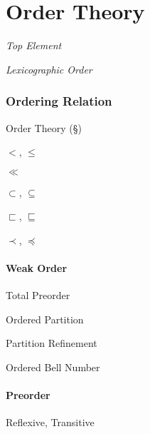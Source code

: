 \part{Order Theory}\label{sec:order_theory}

\emph{Top Element}

\emph{Lexicographic Order}



\section{Ordering Relation}\label{sec:ordering_relation}

Order Theory (\S\ref{sec:order_theory})

$<$, $\leq$

$\ll$

$\subset$, $\subseteq$

$\sqsubset$, $\sqsubseteq$

$\prec$, $\preceq$



\subsection{Weak Order}\label{sec:weak_order}

Total Preorder

Ordered Partition

Partition Refinement %

Ordered Bell Number



\subsection{Preorder}\label{sec:preorder}

Reflexive, Transitive


